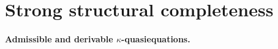 \documentclass[submission,copyright,creativecommons]{eptcs}
\newtheorem{theorem}{Theorem}[section]
\theoremstyle{definition}
\newcommand{\alg}[1]{{{\textbf{\upshape #1}}}}
\newcommand{\vv}[1]{\mathsf {#1}}
\newcommand{\WsV}{\mathfrak{b}_\vv V}
\newcommand{\kk}{\kappa}
\newcommand{\csq}{\mathfrak{c}}
\begin{document}

\section{Strong structural completeness}\label{sec-SSCpl}


\paragraph{Admissible and derivable $\kk$-quasiequations.}
\end{document}
